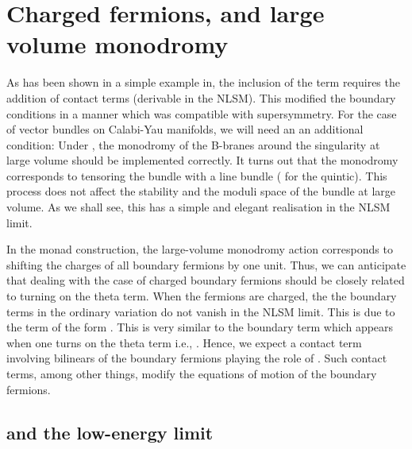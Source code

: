 \documentclass[a4paper,12pt]{article}
\begin{document}
\section{Charged fermions, \coordHE{} and large volume monodromy}
\label{seclvmon}


As has been shown in a simple example in\cite{lsmone,HIV}, the inclusion of the
\myHighlight{$\theta$}\coordHE{} term
requires the addition of contact terms (derivable in the NLSM).
This modified the boundary conditions in a manner which was compatible
with supersymmetry. For
the case of vector bundles on Calabi-Yau manifolds, we will need an
an additional condition: Under \myHighlight{$\theta\rightarrow \theta+2\pi$}\coordHE{}, the
monodromy of the B-branes around the singularity at large volume
should be implemented correctly. It turns out
that the monodromy corresponds to tensoring the bundle with a
line bundle (\coordHE{} for the quintic). This process does not
affect the stability and the moduli space of the bundle at large volume.
As we shall see, this has a simple and elegant realisation in the
NLSM limit. 

In the monad construction, the large-volume monodromy action
corresponds to shifting the charges of all boundary fermions by one
unit. Thus, we can anticipate that dealing with the case of charged
boundary fermions should be closely related to turning on the theta
term.
When the fermions are charged, the 
the boundary terms in the ordinary variation do not vanish 
in the NLSM limit. This is
due to the term of the form \coordHE{}.
This is very similar to the boundary term which appears when
one turns on the theta term i.e., \coordHE{}. Hence,
we expect a contact term involving bilinears of the boundary fermions
playing the role of \myHighlight{$\theta$}\coordHE{}. Such contact terms, among other things,
modify the equations of motion of the boundary fermions.

\subsection{\coordHE{} and the low-energy limit}
\end{document}
